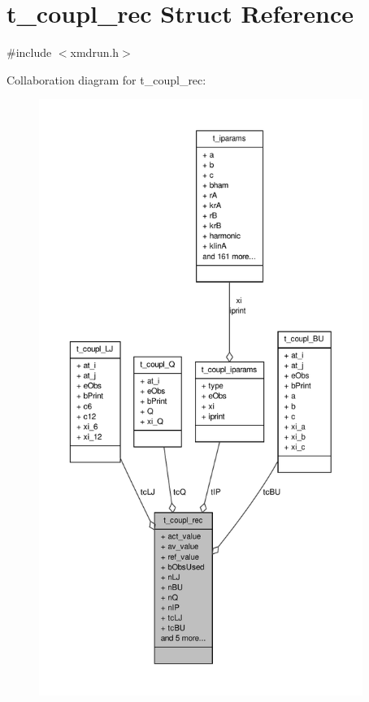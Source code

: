 \hypertarget{structt__coupl__rec}{\section{t\-\_\-coupl\-\_\-rec \-Struct \-Reference}
\label{structt__coupl__rec}
}


{\ttfamily \#include $<$xmdrun.\-h$>$}



\-Collaboration diagram for t\-\_\-coupl\-\_\-rec\-:
\nopagebreak
\begin{figure}[H]
\begin{center}
\leavevmode
\includegraphics[height=550pt]{structt__coupl__rec__coll__graph}
\end{center}
\end{figure}
